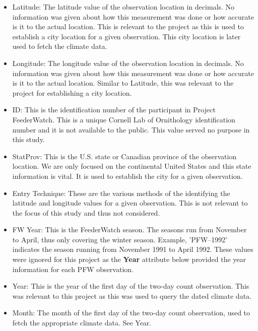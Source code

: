 \begin{itemize}

  \item Latitude: The latitude value of the observation location in decimals. No information was given about how this measurement was done or how accurate is it to the actual location. This is relevant to the project as this is used to establish a city location for a given observation. This city location is later used to fetch the climate data.
  
  \item Longitude: The longitude value of the observation location in decimals. No information was given about how this measurement was done or how accurate is it to the actual location. Similar to Latitude, this was relevant to the project for establishing a city location.
  
  \item ID: This is the identification number of the participant in Project FeederWatch. This is a unique Cornell Lab of Ornithology identification number and it is not available to the public. This value served no purpose in this study.
  
  \item StatProv: This is the U.S. state or Canadian province of the observation location. We are only focused on the continental United States and this state information is vital. It is used to establish the city for a given observation.
  
  \item Entry Technique: These are the various methods of the identifying the latitude and longitude values for a given observation. This is not relevant to the focus of this study and thus not considered.
  
  \item FW Year: This is the FeederWatch season. The seasons run from November to April, thus only covering the winter season. Example, 'PFW--1992' indicates the season running from November 1991 to April 1992. These values were ignored for this project as the \textbf{Year} attribute below provided the year information for each PFW observation.

  \item Year: This is the year of the first day of the two-day count observation. This was relevant to this project as this was used to query the dated climate data.
  
  \item Month: The month of the first day of the two-day count observation, used to fetch the appropriate climate data. See Year.
  

\end{itemize}
